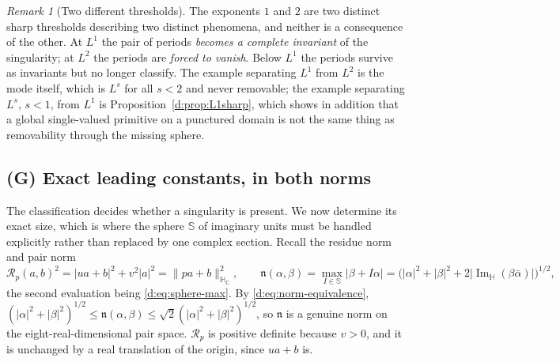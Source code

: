 \documentclass[11pt,a4paper]{article}
\numberwithin{equation}{section}
\theoremstyle{definition}
\theoremstyle{remark}
\newtheorem{remark}[theorem]{Remark}
\theoremstyle{plain}
\newcommand{\HH}{\mathbb H}
\newcommand{\HC}{\mathbb H_{\mathbb C}}
\newcommand{\SSS}{\mathbb S}
\DeclareMathOperator{\Ima}{Im}
\newcommand{\ImH}{\Ima_{\HH}}
\newcommand{\Rp}{\mathcal R_{p}}      %
\newcommand{\nn}{\mathfrak n}         %
\newcommand{\abs}[1]{\lvert #1\rvert}
\newcommand{\norm}[1]{\lVert #1\rVert}
\begin{document}
\begin{remark}[Two different thresholds]
\label{d:rem:two-thresholds}
The exponents $1$ and $2$ are two distinct sharp thresholds describing two
distinct phenomena, and neither is a consequence of the other.  At $L^1$
the pair of periods \emph{becomes a complete invariant} of the singularity;
at $L^2$ the periods are \emph{forced to vanish}.  Below $L^1$ the periods
survive as invariants but no longer classify.  The example separating
$L^1$ from $L^2$ is the mode itself, which is $L^s$ for all $s<2$ and never
removable; the example separating $L^s$, $s<1$, from $L^1$ is
Proposition~\ref{d:prop:L1sharp}, which shows in addition that a global
single-valued primitive on a punctured domain is not the same thing as
removability through the missing sphere.
\end{remark}

\subsection{(G) Exact leading constants, in both norms}

The classification decides whether a singularity is present.  We now
determine its exact size, which is where the sphere $\SSS$ of imaginary
units must be handled explicitly rather than replaced by one complex
section.  Recall the residue norm and pair norm
\begin{equation}
 \Rp(a,b)^2=\abs{ua+b}^2+v^2\abs a^2=\norm{pa+b}_{\HC}^2,
 \qquad
 \nn(\alpha,\beta)=\max_{I\in\SSS}\abs{\beta+I\alpha}
 =\bigl(\abs\alpha^2+\abs\beta^2
        +2\abs{\ImH(\beta\bar\alpha)}\bigr)^{1/2},
 \label{d:eq:residue-norm}
\end{equation}
the second evaluation being \eqref{d:eq:sphere-max}.  By
\eqref{d:eq:norm-equivalence},
$(\abs\alpha^2+\abs\beta^2)^{1/2}\le\nn(\alpha,\beta)
 \le\sqrt2(\abs\alpha^2+\abs\beta^2)^{1/2}$, so $\nn$ is a genuine norm on
the eight-real-dimensional pair space.  $\Rp$ is positive definite because
$v>0$, and it is unchanged by a real translation of the origin, since
$ua+b$ is.
\end{document}
